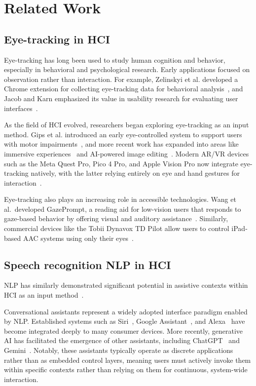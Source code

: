 
\section{Related Work}

\subsection{Eye-tracking in HCI}

Eye-tracking has long been used to study human cognition and behavior, especially in behavioral and psychological research. Early applications focused on observation rather than interaction. For example, Zelinskyi et al. developed a Chrome extension for collecting eye-tracking data for behavioral analysis~\cite{zelinskyi2024eyetracking}, and Jacob and Karn emphasized its value in usability research for evaluating user interfaces~\cite{jacob2003commentary}.

As the field of \ac{HCI} evolved, researchers began exploring eye-tracking as an input method. Gips et al. introduced an early eye-controlled system to support users with motor impairments~\cite{gips1996eagleeyes}, and more recent work has expanded into areas like immersive experiences~\cite{dondi2023gazehci} and AI-powered image editing~\cite{karlander2023ai}. Modern AR/VR devices such as the Meta Quest Pro, Pico 4 Pro, and Apple Vision Pro now integrate eye-tracking natively, with the latter relying entirely on eye and hand gestures for interaction~\cite{huang2024visionpro}.

Eye-tracking also plays an increasing role in accessible technologies. Wang et al.\ developed GazePrompt, a reading aid for low-vision users that responds to gaze-based behavior by offering visual and auditory assistance~\cite{wang2024gazeprompt}. Similarly, commercial devices like the Tobii Dynavox TD Pilot allow users to control iPad-based AAC systems using only their eyes~\cite{poster2025td}.

\subsection{Speech recognition NLP in HCI}

\ac{NLP} has similarly demonstrated significant potential in assistive contexts within HCI as an input method~\cite{song2024review}. 

Conversational assistants represent a widely adopted interface paradigm enabled by NLP. Established systems such as Siri~\cite{apple_siri}, Google Assistant~\cite{google_assistant}, and Alexa~\cite{amazon_alexa} have become integrated deeply to many consumer devices. More recently, generative AI has facilitated the emergence of other assistants, including ChatGPT~\cite{openai_chatgpt} and Gemini~\cite{google_gemini}. Notably, these assistants typically operate as discrete applications rather than as embedded control layers, meaning users must actively invoke them within specific contexts rather than relying on them for continuous, system-wide interaction.

